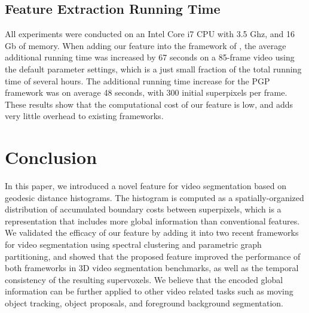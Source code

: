 \documentclass[runningheads]{llncs}
\begin{document}
\subsection{Feature Extraction Running Time}

All experiments were conducted on an Intel Core i7 CPU with 3.5 Ghz, and 16 Gb of memory. When adding our feature into the framework of \cite{Galasso2013}, the average additional running time was increased by 67 seconds on a 85-frame video using the default parameter settings, which is a just small fraction of the total running time of several hours. The additional running time increase for the PGP framework was on average 48 seconds, with 300 initial superpixels per frame. These results show that the computational cost of our feature is low, and adds very little overhead to existing frameworks.

\section{Conclusion}
\label{sec:cl}
In this paper, we introduced a novel feature for video segmentation based on geodesic distance histograms. The histogram is computed as a spatially-organized distribution of accumulated boundary costs between superpixels, which is a representation that includes more global information than conventional features. We validated the efficacy of our feature by adding it into two recent frameworks  for video segmentation using spectral clustering and parametric graph partitioning, and showed that the proposed feature improved the performance of both frameworks in 3D video segmentation benchmarks, as well as the temporal consistency of the resulting supervoxels. We believe that the encoded global information can be further applied to other video related tasks such as moving object tracking, object proposals, and foreground background segmentation.
\end{document}
